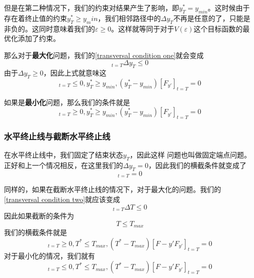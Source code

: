 \documentclass[UTF8,12pt]{ctexart}
\numberwithin{equation}{section} %
\numberwithin{figure}{section}
\numberwithin{table}{section}
\begin{document}
	但是在第二种情况下，我们的约束对结果产生了影响，即$y_T^{*} = y_{min}$。这时候由于存在着终止值的约束$y_T^{*} \geqslant y_min$，我们相邻路径中的$\Delta y_T$不再是任意的了，只能是非负的。这同时意味着我们的$\varepsilon \geqslant 0$。这样就等同于对于$V(\varepsilon)$这个目标函数的最优化添加了约束。
	
	那么对于\textbf{最大化}问题，我们的\ref{transversal condition one}就会变成
	\begin{equation}
		[F_{y'}]_{t = T}\Delta y_T \leqslant 0
	\end{equation}
	由于$\Delta y_T \geqslant 0$，因此上式就意味这
	\begin{equation}
		[F_{y'}]_{t = T} \leqslant 0,y_{T}^{*} \geqslant y_{min},(y_{T}^{*} - y_{min})[F_{y'}]_{t = T} = 0
	\end{equation}
	
	如果是\textbf{最小化}问题，那么我们的条件就是
	\begin{equation}
		[F_{y'}]_{t = T} \geqslant 0,y_{T}^{*} \geqslant y_{min},(y_{T}^{*} - y_{min})[F_{y'}]_{t = T} = 0
	\end{equation}

	\subsubsection{水平终止线与截断水平终止线}
	在水平终止线中，我们固定了结束状态$y_T$，因此这样 问题也叫做固定端点问题。正好和上一个情况相反，在这里我们的$\Delta y_T = 0$，因此我们的横截条件就变成了
	\begin{equation}
		[F-y'F_{y'}]_{t = T} = 0 \label{transversal condition two}
	\end{equation}

	同样的，如果在截断水平终止线的情况下，对于最大化的问题。我们的\ref{transversal condition two}就应该变成
	\begin{equation}
		[F-y'F_{y'}]_{t = T}\Delta T \leqslant 0
	\end{equation}
	因此如果截断的条件为
	\begin{equation}
		T \leqslant T_{max}
	\end{equation}
	我们的横截条件就是
	\begin{equation}
		[F-y'F_{y'}]_{t = T} \geqslant 0,T^* \leqslant T_{max},(T^* - T_{max})[F-y'F_{y'}]_{t = T} = 0
	\end{equation}
	对于最小化的情况，我们就有
	\begin{equation}
		[F-y'F_{y'}]_{t = T} \leqslant 0,T^* \leqslant T_{max},(T^* - T_{max})[F-y'F_{y'}]_{t = T} = 0
	\end{equation}
\end{document}
